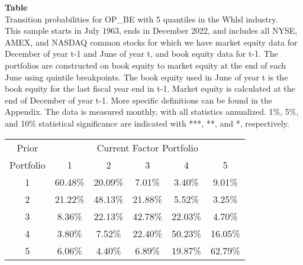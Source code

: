 \begin{table*}[ht!]
\raggedright
{}
\label{tab: transition_probs_OP_BE_Whlsl_with_5_quantiles}
\textbf{Table \thetable} \\
Transition probabilities for OP_BE with 5 quantiles in the Whlsl industry. \\
\hspace*{1em}This sample starts in July 1963, ends in December 2022, and includes all NYSE, AMEX, and NASDAQ common stocks for which we have market equity data for December of year t-1 and June of year t, and book equity data for t-1. The portfolios are constructed on book equity to market equity at the end of each June using quintile breakpoints.  The book equity used in June of year t is the book equity for the last fiscal year end in t-1.  Market equity is calculated at the end of December of year t-1.  More specific definitions can be found in the Appendix.  The data is measured monthly, with all statistics annualized.  1\%, 5\%, and 10\% statistical significance are indicated with ***, **, and *, respectively. \\
\vspace{0.5em}
\centering
\begin{adjustbox}{max width=\textwidth}
\begin{tabular}{@{}cccccc@{}}
\toprule
Prior & \multicolumn{5}{c}{Current Factor Portfolio} \\
Portfolio & 1 & 2 & 3 & 4 & 5 \\
\midrule
1 & 60.48\% & 20.09\% & 7.01\% & 3.40\% & 9.01\% \\
2 & 21.22\% & 48.13\% & 21.88\% & 5.52\% & 3.25\% \\
3 & 8.36\% & 22.13\% & 42.78\% & 22.03\% & 4.70\% \\
4 & 3.80\% & 7.52\% & 22.40\% & 50.23\% & 16.05\% \\
5 & 6.06\% & 4.40\% & 6.89\% & 19.87\% & 62.79\% \\
\bottomrule
\end{tabular}
\end{adjustbox}
\end{table*}